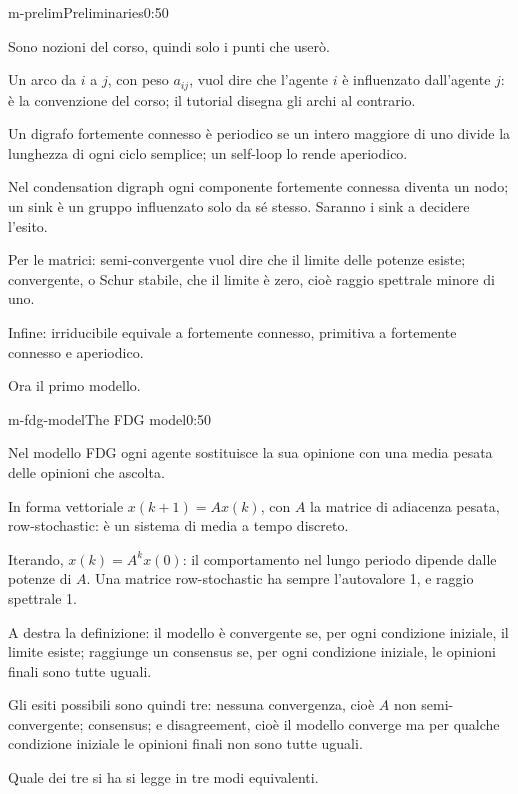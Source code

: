 \begin{slide}{m-prelim}{Preliminaries}{0:50}
  \begin{discorso}
    \item Sono nozioni del corso, quindi solo i punti che userò.
    \item Un arco da $i$ a $j$, con peso $a_{ij}$, vuol dire che l'agente $i$ è influenzato dall'agente $j$: è la convenzione del corso; il tutorial disegna gli archi al contrario.
    \item Un digrafo fortemente connesso è periodico se un intero maggiore di uno divide la lunghezza di ogni ciclo semplice; un self-loop lo rende aperiodico.
    \item Nel condensation digraph ogni componente fortemente connessa diventa un nodo; un sink è un gruppo influenzato solo da sé stesso. Saranno i sink a decidere l'esito.
    \item Per le matrici: semi-convergente vuol dire che il limite delle potenze esiste; convergente, o Schur stabile, che il limite è zero, cioè raggio spettrale minore di uno.
    \item Infine: irriducibile equivale a fortemente connesso, primitiva a fortemente connesso e aperiodico.
    \item Ora il primo modello.
  \end{discorso}
\end{slide}


\begin{slide}{m-fdg-model}{The FDG model}{0:50}
  \begin{discorso}
    \item Nel modello FDG ogni agente sostituisce la sua opinione con una media pesata delle opinioni che ascolta.
    \item In forma vettoriale $x(k+1)=Ax(k)$, con $A$ la matrice di adiacenza pesata, row-stochastic: è un sistema di media a tempo discreto.
    \item Iterando, $x(k)=A^kx(0)$: il comportamento nel lungo periodo dipende dalle potenze di $A$. Una matrice row-stochastic ha sempre l'autovalore 1, e raggio spettrale 1.
    \item A destra la definizione: il modello è convergente se, per ogni condizione iniziale, il limite esiste; raggiunge un consensus se, per ogni condizione iniziale, le opinioni finali sono tutte uguali.
    \item Gli esiti possibili sono quindi tre: nessuna convergenza, cioè $A$ non semi-convergente; consensus; e disagreement, cioè il modello converge ma per qualche condizione iniziale le opinioni finali non sono tutte uguali.
    \item Quale dei tre si ha si legge in tre modi equivalenti.
  \end{discorso}
\end{slide}

